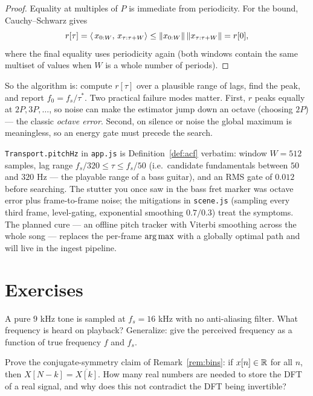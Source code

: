 \begin{proof}
Equality at multiples of $P$ is immediate from periodicity. For the bound,
Cauchy--Schwarz gives
\[
r[\tau] = \ip*{\,x_{0:W},\, x_{\tau:\tau+W}}
\le \norm{x_{0:W}} \, \norm{x_{\tau:\tau+W}} = r[0],
\]
where the final equality uses periodicity again (both windows contain the
same multiset of values when $W$ is a whole number of periods).
\end{proof}

So the algorithm is: compute $r[\tau]$ over a plausible range of lags, find
the peak, and report $f_0 = f_s / \tau^\ast$. Two practical failure modes
matter. First, $r$ peaks equally at $2P, 3P, \dots$, so noise can make the
estimator jump down an octave (choosing $2P$) --- the classic \emph{octave
error}. Second, on silence or noise the global maximum is meaningless, so an
energy gate must precede the search.

\begin{incode}
\texttt{Transport.pitchHz} in \texttt{app.js} is
Definition~\ref{def:acf} verbatim: window $W = 512$ samples, lag range
$f_s/320 \le \tau \le f_s/50$ (i.e.\ candidate fundamentals between $50$ and
$320$ Hz --- the playable range of a bass guitar), and an RMS gate of
$0.012$ before searching. The stutter you once saw in the bass fret marker
was octave error plus frame-to-frame noise; the mitigations in
\texttt{scene.js} (sampling every third frame, level-gating, exponential
smoothing $0.7/0.3$) treat the symptoms. The planned cure --- an offline
pitch tracker with Viterbi smoothing across the whole song --- replaces the
per-frame $\argmax$ with a globally optimal path and will live in the ingest
pipeline.
\end{incode}

\section*{Exercises}

\begin{exercise}
A pure $9$ kHz tone is sampled at $f_s = 16$ kHz with no anti-aliasing
filter. What frequency is heard on playback? Generalize: give the perceived
frequency as a function of true frequency $f$ and $f_s$.
\end{exercise}

\begin{exercise}
Prove the conjugate-symmetry claim of Remark~\ref{rem:bins}: if
$x[n] \in \R$ for all $n$, then $X[N - k] = \overline{X[k]}$. How many real
numbers are needed to store the DFT of a real signal, and why does this not
contradict the DFT being invertible?
\end{exercise}

